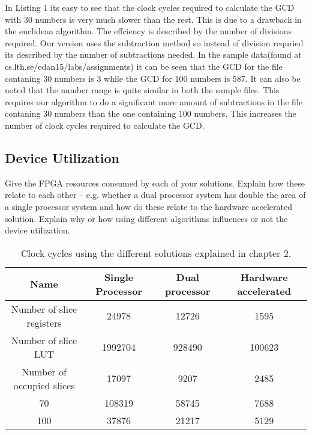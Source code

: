 \documentclass[11pt]{article}
\begin{document}
In Listing 1 its easy to see that the clock cycles required to calculate the GCD with 30 numbers is very much slower than the rest. This is due to a drawback in the euclidean algorithm. The effciency is described by the number of divisions required. Our version uses the subtraction method so instead of division requried its described by the number of subtractions needed. In the sample data(found at cs.lth.se/edan15/labs/assignments) it can be seen that the GCD for the file contaning 30 numbers is 3 while the GCD for 100 numbers is 587. It can also be noted that the number range is quite similar in both the sample files. This requires our algorithm to do a significant more amount of subtractions in the file contaning 30 numbers than the one containing 100 numbers. This increases the number of clock cycles required to calculate the GCD.




\subsection{Device Utilization}
Give the FPGA resources consumed by each of your solutions. Explain how these relate to each other -- e.g. whether a dual processor system has double the area of a single processor system and how do these relate to the hardware accelerated solution. Explain why or how using different algorithms influences or not the device utilization.


\begin{table}[htbp]
   \centering
   \begin{tabular}{@{} cccc @{}} %
      \toprule
      \cmidrule(r){1-2} %
	Name	& Single Processor	& Dual processor	& Hardware accelerated\\
      \midrule
      Number of slice registers	& 24978			& 12726			&1595\\
      Number of slice LUT	& 1992704		&  928490		&100623\\
      Number of occupied slices	& 17097			& 9207			&2485\\
      70	& 108319		& 58745			&7688\\
     100	& 37876			&  21217		&5129\\
      \bottomrule
   \end{tabular}
   \caption{Clock cycles using the different solutions explained in chapter 2.}
   \label{tab:Utilization}
\end{table}
\end{document}

